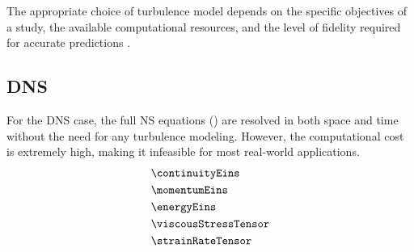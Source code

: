 The appropriate choice of turbulence model depends on the specific objectives
of a study, the available computational resources, and the level of fidelity
required for accurate predictions \cite{Smits2009}.

\subsection{\acrfull{DNS}}
For the \gls{DNS} case, the full \gls{NS} equations
() are resolved in both space and time
without the need for any turbulence modeling. However, the computational cost
is extremely high, making it infeasible for most real-world applications. 
\begin{subequations}\label{eq:navierStokesEquationsEins}
    \begin{align}
        &\continuityEins \label{eq:continuityEins}\\
        &\momentumEins \label{eq:momentumEins} \\
        &\energyEins \label{eq:energyEins} \\
        &\viscousStressTensor \label{eq:viscousStressTensor} \\
        &\strainRateTensor \label{eq:strainRateTensor}
    \end{align}
\end{subequations}

